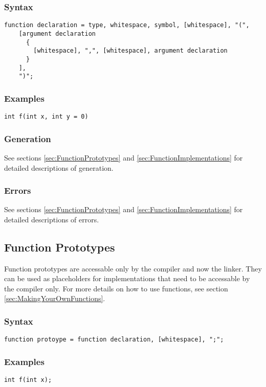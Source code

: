 \documentclass[10pt,a4paper]{article}
\begin{document}
\subsubsection{Syntax}
\begin{verbatim}
function declaration = type, whitespace, symbol, [whitespace], "(",
    [argument declaration
      {
        [whitespace], ",", [whitespace], argument declaration
      }
    ],
    ")";
\end{verbatim}

\subsubsection{Examples}
\begin{verbatim}
int f(int x, int y = 0)
\end{verbatim}

\subsubsection{Generation}
See sections \ref{sec:FunctionPrototypes} and \ref{sec:FunctionImplementations} for detailed descriptions of generation.

\subsubsection{Errors}
See sections \ref{sec:FunctionPrototypes} and \ref{sec:FunctionImplementations} for detailed descriptions of errors.

\newpage




\subsection{Function Prototypes}
Function prototypes are accessable only by the compiler and now the linker. They can be used as placeholders for implementations that need to be accessable by the compiler only. For more details on how to use functions, see section \ref{sec:MakingYourOwnFunctions}.

\subsubsection{Syntax}
\begin{verbatim}
function protoype = function declaration, [whitespace], ";";
\end{verbatim}

\subsubsection{Examples}
\begin{verbatim}
int f(int x);
\end{verbatim}
\end{document}
